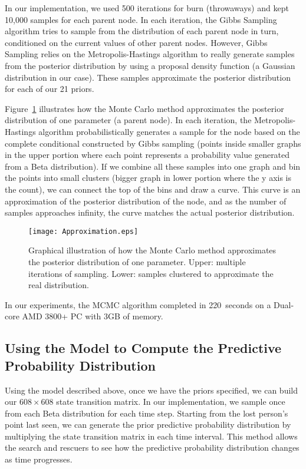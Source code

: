 In our implementation, we used 500 iterations for burn (throwaways) and kept 10,000 samples for each parent node. In each iteration, the Gibbs Sampling algorithm tries to sample from the distribution of each parent node in turn, conditioned on the current values of other parent nodes. However, Gibbs Sampling relies on the Metropolis-Hastings algorithm to really generate samples from the posterior distribution by using a proposal density function (a Gaussian distribution in our case). These samples approximate the posterior distribution for each of our 21 priors. 

Figure~\ref{Approximation} illustrates how the Monte Carlo method approximates the posterior distribution of one parameter (a parent node). In each iteration, the Metropolis-Hastings algorithm probabilistically generates a sample for the node based on the complete conditional constructed by Gibbs sampling (points inside smaller graphs in the upper portion where each point represents a probability value generated from a Beta distribution). If we combine all these samples into one graph and bin the points into small clusters (bigger graph in lower portion where the y axis is the count), we can connect the top of the bins and draw a curve. This curve is an approximation of the posterior distribution of the node, and as the number of samples approaches infinity, the curve matches the actual posterior distribution.

\begin{figure}
\centering
\texttt{[image: Approximation.eps]}
\caption[Illustration of Monte Carlo method approximating posterior distribution]{Graphical illustration of how the Monte Carlo method approximates the posterior distribution of one parameter. Upper: multiple iterations of sampling. Lower: samples clustered to approximate the real distribution.}
\label{Approximation}
\end{figure}

In our experiments, the MCMC algorithm completed in 220~seconds on a Dual-core AMD 3800+ PC with 3GB of memory.

\subsection{Using the Model to Compute the Predictive Probability Distribution}
\label{sec:3.6}

Using the model described above, once we have the priors specified, we can build our $608 \times 608$ state transition matrix. In our implementation, we sample once from each Beta distribution for each time step. Starting from the lost person's point last seen, we can generate the prior predictive probability distribution by multiplying the state transition matrix in each time interval. This method allows the search and rescuers to see how the predictive probability distribution changes as time progresses.

